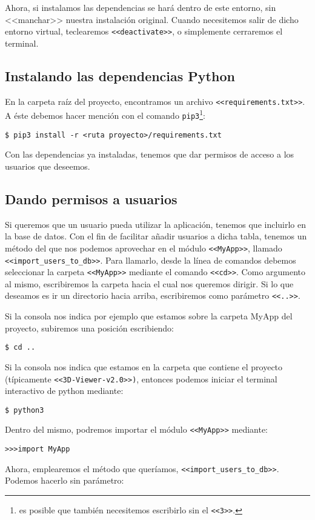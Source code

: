 Ahora, si instalamos las dependencias se hará dentro de este entorno, sin <<manchar>> nuestra instalación original. Cuando necesitemos salir de dicho entorno virtual, teclearemos \texttt{<<deactivate>>}, o simplemente cerraremos el terminal.

\subsection{Instalando las dependencias Python}\label{instalar-dependencias-python}
En la carpeta raíz del proyecto, encontramos un archivo \texttt{<<requirements.txt>>}. A éste debemos hacer mención con el comando \texttt{pip3}\footnote{es posible que también necesitemos escribirlo sin el \texttt{<<3>>}.}:

\noindent\verb|$ pip3 install -r <ruta proyecto>/requirements.txt|

Con las dependencias ya instaladas, tenemos que dar permisos de acceso a los usuarios que deseemos.

\subsection{Dando permisos a usuarios}
Si queremos que un usuario pueda utilizar la aplicación, tenemos que incluirlo en la base de datos. Con el fin de facilitar añadir usuarios a dicha tabla, tenemos un método del que nos podemos aprovechar en el módulo \texttt{<<MyApp>>}, llamado \texttt{<<import\_users\_to\_db>>}. Para llamarlo, desde la línea de comandos debemos seleccionar la carpeta \texttt{<<MyApp>>} mediante el comando \texttt{<<cd>>}. Como argumento al mismo, escribiremos la carpeta hacia el cual nos queremos dirigir. Si lo que deseamos es ir un directorio hacia arriba, escribiremos como parámetro \texttt{<<..>>}.

Si la consola nos indica por ejemplo que estamos sobre la carpeta MyApp del proyecto, subiremos una posición escribiendo:

\noindent\verb|$ cd ..|

Si la consola nos indica que estamos en la carpeta que contiene el proyecto (típicamente \texttt{<<3D-Viewer-v2.0>>)}, entonces podemos iniciar el terminal interactivo de python mediante:

\noindent\verb|$ python3|

Dentro del mismo, podremos importar el módulo \texttt{<<MyApp>>} mediante:

\noindent\verb|>>>import MyApp|

Ahora, emplearemos el método que queríamos, \texttt{<<import\_users\_to\_db>>}. Podemos hacerlo sin parámetro:

